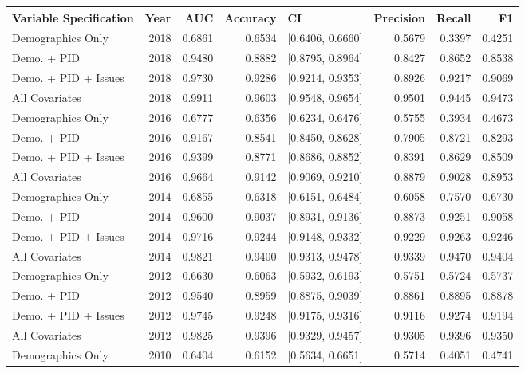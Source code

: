\begin{table}[H]
\centering
\begin{tabular}{lrrrlrrr}
  \toprule
Variable Specification & Year & AUC & Accuracy & CI & Precision & Recall & F1 \\ 
  \midrule
Demographics Only & 2018 & 0.6861 & 0.6534 & [0.6406, 0.6660] & 0.5679 & 0.3397 & 0.4251 \\ 
  Demo. + PID & 2018 & 0.9480 & 0.8882 & [0.8795, 0.8964] & 0.8427 & 0.8652 & 0.8538 \\ 
  Demo. + PID + Issues & 2018 & 0.9730 & 0.9286 & [0.9214, 0.9353] & 0.8926 & 0.9217 & 0.9069 \\ 
  All Covariates & 2018 & 0.9911 & 0.9603 & [0.9548, 0.9654] & 0.9501 & 0.9445 & 0.9473 \\ 
  Demographics Only & 2016 & 0.6777 & 0.6356 & [0.6234, 0.6476] & 0.5755 & 0.3934 & 0.4673 \\ 
  Demo. + PID & 2016 & 0.9167 & 0.8541 & [0.8450, 0.8628] & 0.7905 & 0.8721 & 0.8293 \\ 
  Demo. + PID + Issues & 2016 & 0.9399 & 0.8771 & [0.8686, 0.8852] & 0.8391 & 0.8629 & 0.8509 \\ 
  All Covariates & 2016 & 0.9664 & 0.9142 & [0.9069, 0.9210] & 0.8879 & 0.9028 & 0.8953 \\ 
  Demographics Only & 2014 & 0.6855 & 0.6318 & [0.6151, 0.6484] & 0.6058 & 0.7570 & 0.6730 \\ 
  Demo. + PID & 2014 & 0.9600 & 0.9037 & [0.8931, 0.9136] & 0.8873 & 0.9251 & 0.9058 \\ 
  Demo. + PID + Issues & 2014 & 0.9716 & 0.9244 & [0.9148, 0.9332] & 0.9229 & 0.9263 & 0.9246 \\ 
  All Covariates & 2014 & 0.9821 & 0.9400 & [0.9313, 0.9478] & 0.9339 & 0.9470 & 0.9404 \\ 
  Demographics Only & 2012 & 0.6630 & 0.6063 & [0.5932, 0.6193] & 0.5751 & 0.5724 & 0.5737 \\ 
  Demo. + PID & 2012 & 0.9540 & 0.8959 & [0.8875, 0.9039] & 0.8861 & 0.8895 & 0.8878 \\ 
  Demo. + PID + Issues & 2012 & 0.9745 & 0.9248 & [0.9175, 0.9316] & 0.9116 & 0.9274 & 0.9194 \\ 
  All Covariates & 2012 & 0.9825 & 0.9396 & [0.9329, 0.9457] & 0.9305 & 0.9396 & 0.9350 \\ 
  Demographics Only & 2010 & 0.6404 & 0.6152 & [0.5634, 0.6651] & 0.5714 & 0.4051 & 0.4741 \\ 

\end{tabular}
\end{table}
